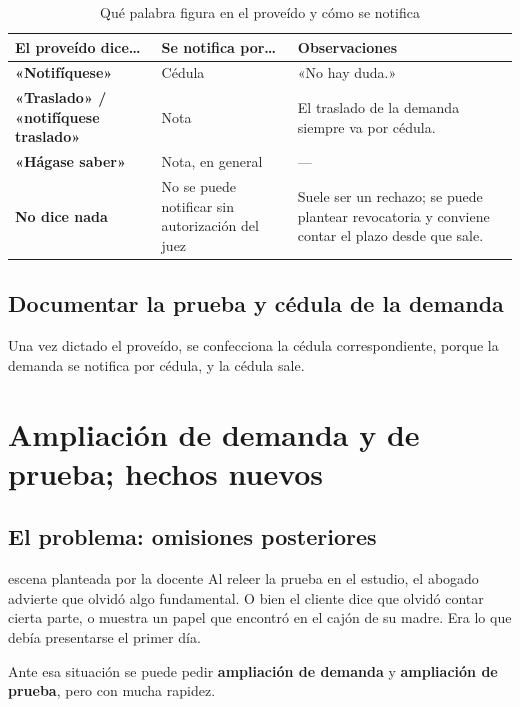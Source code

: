 \documentclass[12pt,oneside]{book}
\begin{document}
\begin{table}[H]
\centering
\caption{Qué palabra figura en el proveído y cómo se notifica}
\begin{tabularx}{\textwidth}{L{0.25\textwidth} L{0.22\textwidth} Y}
\toprule
\textbf{El proveído dice\ldots} & \textbf{Se notifica por\ldots} & \textbf{Observaciones} \\
\midrule
\textbf{«Notifíquese»} & Cédula & «No hay duda.» \\
\addlinespace
\textbf{«Traslado» / «notifíquese traslado»} & Nota & El traslado de la demanda siempre va por cédula. \\
\addlinespace
\textbf{«Hágase saber»} & Nota, en general & --- \\
\addlinespace
\textbf{No dice nada} & No se puede notificar sin autorización del juez & Suele ser un rechazo; se puede plantear revocatoria y conviene contar el plazo desde que sale. \\
\bottomrule
\end{tabularx}
\end{table}

\subsection{Documentar la prueba y cédula de la demanda}

Una vez dictado el proveído, se confecciona la cédula correspondiente, porque la demanda se notifica por cédula, y la cédula sale.

\section{Ampliación de demanda y de prueba; hechos nuevos}

\subsection{El problema: omisiones posteriores}

\begin{example}{escena planteada por la docente}
Al releer la prueba en el estudio, el abogado advierte que olvidó algo fundamental. O bien el cliente dice que olvidó contar cierta parte, o muestra un papel que encontró en el cajón de su madre. Era lo que debía presentarse el primer día.
\end{example}

Ante esa situación se puede pedir \textbf{ampliación de demanda} y \textbf{ampliación de prueba}, pero con mucha rapidez.
\end{document}
